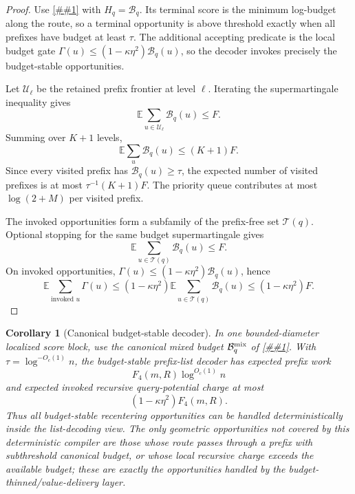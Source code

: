 \documentclass[10pt]{article}
\newcommand{\cref}[1]{\ref{##1}}
\newtheorem{corollary}[theorem]{Corollary}
\theoremstyle{definition}
\newcommand{\E}{\mathbb{E}}
\begin{document}
\begin{proof}
   Use \cref{lem:continuation-list-certificate} with \(H_q=\mathcal B_q\).
   Its terminal score is the minimum log-budget along the route, so a terminal
   opportunity is above threshold exactly when all prefixes have budget at
   least \(\tau\).  The additional accepting predicate is the local budget gate
   \(\Gamma(u)\le(1-\kappa\eta^2)\mathcal B_q(u)\), so the decoder invokes
   precisely the budget-stable opportunities.

   Let \(\mathcal U_\ell\) be the retained prefix frontier at level \(\ell\).
   Iterating the supermartingale inequality gives
   \[
      \E\sum_{u\in\mathcal U_\ell}\mathcal B_q(u)\le F .
   \]
   Summing over \(K+1\) levels,
   \[
      \E\sum_u\mathcal B_q(u)\le (K+1)F .
   \]
   Since every visited prefix has \(\mathcal B_q(u)\ge\tau\), the expected
   number of visited prefixes is at most \(\tau^{-1}(K+1)F\).  The priority
   queue contributes at most \(\log(2+M)\) per visited prefix.

   The invoked opportunities form a subfamily of the prefix-free set
   \(\mathcal T(q)\).  Optional stopping for the same budget supermartingale
   gives
   \[
      \E\sum_{u\in\mathcal T(q)}\mathcal B_q(u)\le F .
   \]
   On invoked opportunities,
   \(\Gamma(u)\le(1-\kappa\eta^2)\mathcal B_q(u)\), hence
   \[
      \E\sum_{\text{invoked }u}\Gamma(u)
      \le
      (1-\kappa\eta^2)
      \E\sum_{u\in\mathcal T(q)}\mathcal B_q(u)
      \le
      (1-\kappa\eta^2)F .
   \]
\end{proof}

\begin{corollary}[Canonical budget-stable decoder]
   \label{cor:canonical-budget-stable-decoder}
   In one bounded-diameter localized score block, use the canonical mixed
   budget \(\mathcal B_q^{\rm mix}\) of
   \cref{lem:canonical-mixed-budget}.  With
   \(\tau=\log^{-O_c(1)}n\), the budget-stable prefix-list decoder has expected
   prefix work
   \[
      F_4(m,R)\log^{O_c(1)}n
   \]
   and expected invoked recursive query-potential charge at most
   \[
      (1-\kappa\eta^2)F_4(m,R).
   \]
   Thus all budget-stable recentering opportunities can be handled
   deterministically inside the list-decoding view.  The only geometric
   opportunities not covered by this deterministic compiler are those whose
   route passes through a prefix with subthreshold canonical budget, or whose
   local recursive charge exceeds the available budget; these are exactly the
   opportunities handled by the budget-thinned/value-delivery layer.
\end{corollary}
\end{document}
